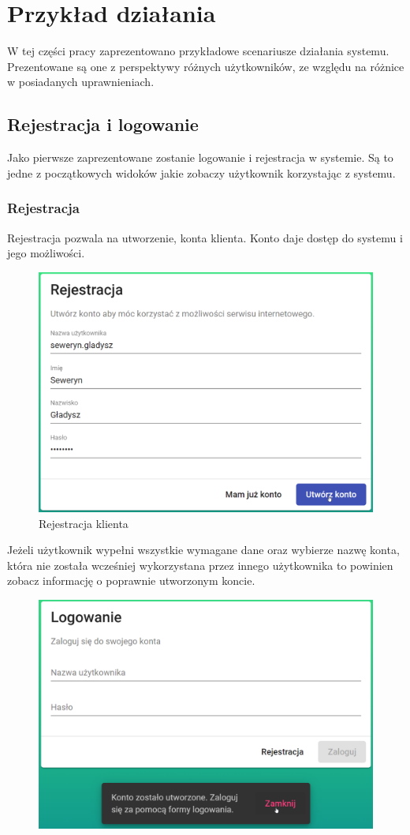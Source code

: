 \documentclass[a4paper,twoside,12pt]{book}
\begin{document}
{\section {Przykład działania}
\label{UseExample}
W tej części pracy zaprezentowano przykładowe scenariusze działania systemu. Prezentowane są one z perspektywy różnych użytkowników, ze względu na różnice w posiadanych uprawnieniach.

\subsection{Rejestracja i logowanie}
Jako pierwsze zaprezentowane zostanie logowanie i rejestracja w systemie. Są to jedne z początkowych widoków jakie zobaczy użytkownik korzystając z systemu.
\subsubsection{Rejestracja}
Rejestracja pozwala na utworzenie, konta klienta. Konto daje dostęp do systemu i jego możliwości.
\begin{figure}[h!]
	\centering
	\includegraphics[width=1\linewidth]{../zrzuty_ekranu/dzialanie/rejestracja_logowanie/rejestracja}
	\caption{Rejestracja klienta}
	\label{fig:rejestracja}
\end{figure}
\FloatBarrier
Jeżeli użytkownik wypełni wszystkie wymagane dane oraz wybierze nazwę konta, która nie została wcześniej wykorzystana przez innego użytkownika to powinien zobacz informację o poprawnie utworzonym koncie.
\begin{figure}[h!]
	\centering
	\includegraphics[width=0.7\linewidth]{../zrzuty_ekranu/dzialanie/rejestracja_logowanie/konto_utworzone}

\end{figure}}
\end{document}
